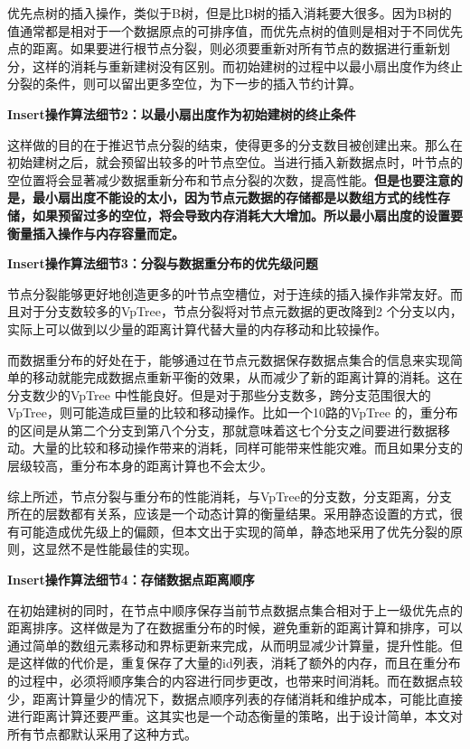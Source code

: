 优先点树的插入操作，类似于B树，但是比B树的插入消耗要大很多。因为B树的值通常都是相对于一个数据原点的可排序值，而优先点树的值则是相对于不同优先点的距离。如果要进行根节点分裂，则必须要重新对所有节点的数据进行重新划分，这样的消耗与重新建树没有区别。而初始建树的过程中以最小扇出度作为终止分裂的条件，则可以留出更多空位，为下一步的插入节约计算。

\textbf{Insert操作算法细节2：以最小扇出度作为初始建树的终止条件}

这样做的目的在于推迟节点分裂的结束，使得更多的分支数目被创建出来。那么在初始建树之后，就会预留出较多的叶节点空位。当进行插入新数据点时，叶节点的空位置将会显著减少数据重新分布和节点分裂的次数，提高性能。\textbf{但是也要注意的是，最小扇出度不能设的太小，因为节点元数据的存储都是以数组方式的线性存储，如果预留过多的空位，将会导致内存消耗大大增加。所以最小扇出度的设置要衡量插入操作与内存容量而定。}

\textbf{Insert操作算法细节3：分裂与数据重分布的优先级问题}

节点分裂能够更好地创造更多的叶节点空槽位，对于连续的插入操作非常友好。而且对于分支数较多的VpTree，节点分裂将对节点元数据的更改降到2 个分支以内，实际上可以做到以少量的距离计算代替大量的内存移动和比较操作。

而数据重分布的好处在于，能够通过在节点元数据保存数据点集合的信息来实现简单的移动就能完成数据点重新平衡的效果，从而减少了新的距离计算的消耗。这在分支数少的VpTree 中性能良好。但是对于那些分支数多，跨分支范围很大的VpTree，则可能造成巨量的比较和移动操作。比如一个10路的VpTree 的，重分布的区间是从第二个分支到第八个分支，那就意味着这七个分支之间要进行数据移动。大量的比较和移动操作带来的消耗，同样可能带来性能灾难。而且如果分支的层级较高，重分布本身的距离计算也不会太少。

综上所述，节点分裂与重分布的性能消耗，与VpTree的分支数，分支距离，分支所在的层数都有关系，应该是一个动态计算的衡量结果。采用静态设置的方式，很有可能造成优先级上的偏颇，但本文出于实现的简单，静态地采用了优先分裂的原则，这显然不是性能最佳的实现。

\textbf{Insert操作算法细节4：存储数据点距离顺序}

在初始建树的同时，在节点中顺序保存当前节点数据点集合相对于上一级优先点的距离排序。这样做是为了在数据重分布的时候，避免重新的距离计算和排序，可以通过简单的数组元素移动和界标更新来完成，从而明显减少计算量，提升性能。但是这样做的代价是，重复保存了大量的id列表，消耗了额外的内存，而且在重分布的过程中，必须将顺序集合的内容进行同步更改，也带来时间消耗。而在数据点较少，距离计算量少的情况下，数据点顺序列表的存储消耗和维护成本，可能比直接进行距离计算还要严重。这其实也是一个动态衡量的策略，出于设计简单，本文对所有节点都默认采用了这种方式。

